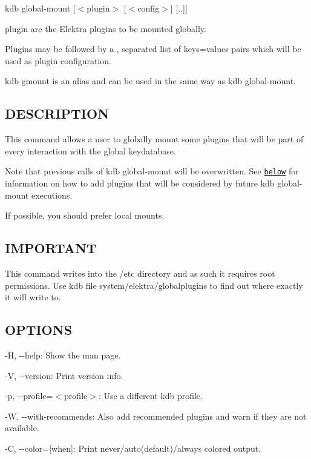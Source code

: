 {\ttfamily kdb global-\/mount \mbox{[}$<$plugin$>$ \mbox{[}$<$config$>$\mbox{]} \mbox{[}..\mbox{]}\mbox{]}}


\begin{DoxyItemize}
\item {\ttfamily plugin} are the Elektra plugins to be mounted globally.
\item Plugins may be followed by a {\ttfamily ,} separated list of {\ttfamily keys=values} pairs which will be used as plugin configuration.
\end{DoxyItemize}

{\ttfamily kdb gmount} is an alias and can be used in the same way as {\ttfamily kdb global-\/mount}.

\subsection*{D\+E\+S\+C\+R\+I\+P\+T\+I\+O\+N}

This command allows a user to globally mount some plugins that will be part of every interaction with the global keydatabase.

Note that previous calls of {\ttfamily kdb global-\/mount} will be overwritten. See \href{#KDB}{\tt below} for information on how to add plugins that will be considered by future {\ttfamily kdb global-\/mount} executions.

If possible, you should prefer local mounts.

\subsection*{I\+M\+P\+O\+R\+T\+A\+N\+T}

This command writes into the {\ttfamily /etc} directory and as such it requires root permissions. Use {\ttfamily kdb file system/elektra/globalplugins} to find out where exactly it will write to.

\subsection*{O\+P\+T\+I\+O\+N\+S}


\begin{DoxyItemize}
\item {\ttfamily -\/\+H}, {\ttfamily -\/-\/help}\+: Show the man page.
\item {\ttfamily -\/\+V}, {\ttfamily -\/-\/version}\+: Print version info.
\item {\ttfamily -\/p}, {\ttfamily -\/-\/profile}=$<$profile$>$\+: Use a different kdb profile.
\item {\ttfamily -\/\+W}, {\ttfamily -\/-\/with-\/recommends}\+: Also add recommended plugins and warn if they are not available.
\item {\ttfamily -\/\+C}, {\ttfamily -\/-\/color}=\mbox{[}when\mbox{]}\+: Print never/auto(default)/always colored output.
\end{DoxyItemize}

